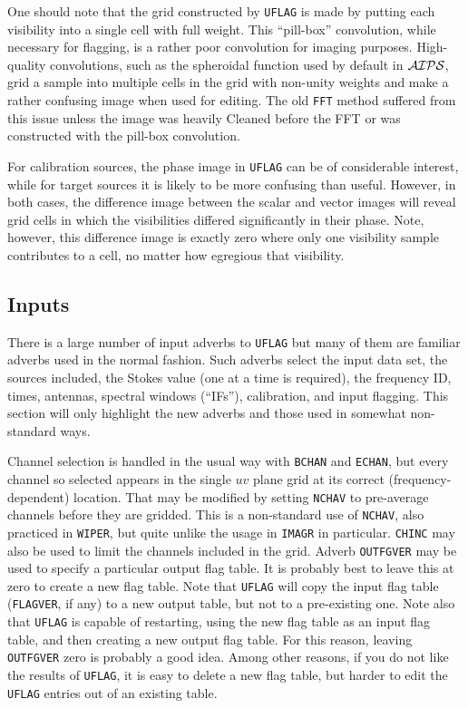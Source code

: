 \documentclass[twoside]{article}
\newcommand{\AIPS}{{$\cal AIPS\/$}}
\begin{document}
One should note that the grid constructed by {\tt UFLAG} is made by
putting each visibility into a single cell with full weight.  This
``pill-box'' convolution, while necessary for flagging, is a rather
poor convolution for imaging purposes.  High-quality convolutions,
such as the spheroidal function used by default in \AIPS, grid a
sample into multiple cells in the grid with non-unity weights and make
a rather confusing image when used for editing.  The old {\tt FFT}
method suffered from this issue unless the image was heavily Cleaned
before the FFT or was constructed with the pill-box convolution.

For calibration sources, the phase image in {\tt UFLAG} can be of
considerable interest, while for target sources it is likely to be
more confusing than useful.  However, in both cases, the difference
image between the scalar and vector images will reveal grid cells in
which the visibilities differed significantly in their phase.  Note,
however, this difference image is exactly zero where only one
visibility sample contributes to a cell, no matter how egregious that
visibility.

\subsection{Inputs}

There is a large number of input adverbs to {\tt UFLAG} but many of
them are familiar adverbs used in the normal fashion.  Such adverbs
select the input data set, the sources included, the Stokes value (one
at a time is required), the frequency ID, times, antennas, spectral
windows (``IFs''), calibration, and input flagging.  This section will
only highlight the new adverbs and those used in somewhat non-standard
ways.

Channel selection is handled in the usual way with {\tt BCHAN} and
{\tt ECHAN}, but every channel so selected appears in the single $uv$
plane grid at its correct (frequency-dependent) location.  That may be
modified by setting {\tt NCHAV} to pre-average channels before they
are gridded.  This is a non-standard use of {\tt NCHAV}, also
practiced in {\tt WIPER}, but quite unlike the usage in {\tt IMAGR} in
particular.  {\tt CHINC} may also be used to limit the channels
included in the grid.  Adverb {\tt OUTFGVER} may be used to specify a
particular output flag table.  It is probably best to leave this at
zero to create a new flag table.  Note that {\tt UFLAG} will copy the
input flag table ({\tt FLAGVER}, if any) to a new output table, but
not to a pre-existing one.  Note also that {\tt UFLAG} is capable of
restarting, using the new flag table as an input flag table, and then
creating a new output flag table.  For this reason, leaving {\tt
  OUTFGVER} zero is probably a good idea.  Among other reasons, if you
do not like the results of {\tt UFLAG}, it is easy to delete a new
flag table, but harder to edit the {\tt UFLAG} entries out of an
existing table.
\end{document}
